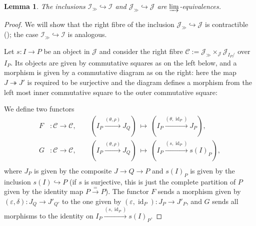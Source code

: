 \documentclass[12pt, reqno]{amsart}
\theoremstyle{plain}
\newtheorem{lemma}[theorem]{Lemma}
\theoremstyle{definition}
\renewcommand{\epsilon}{\varepsilon}
\begin{document}
\begin{lemma}\label{Jgg in J is cofinal}
The inclusions $\mathcal{I}_\gg\hookrightarrow \mathcal{I}$ and $\mathcal{J}_\gg\hookrightarrow \mathcal{J}$ are $\varinjlim$-equivalences.
\end{lemma}
\begin{proof}
We will show that the right fibre of the inclusion $\mathcal{J}_\gg\hookrightarrow \mathcal{J}$ is contractible (\cite[Theorem 2.19]{ClausenOrsnesJansen}); the case $\mathcal{I}_\gg\hookrightarrow \mathcal{I}$ is analogous.

Let $s\colon I\rightarrow P$ be an object in $\mathcal{J}$ and consider the right fibre $\mathcal{C}:=\mathcal{J}_\gg\times_{\mathcal{J}}\mathcal{J}_{I_P/}$ over $I_P$. Its objects are given by commutative squares as on the left below, and a morphism is given by a commutative diagram as on the right: here the map $J\twoheadrightarrow J'$ is required to be surjective and the diagram defines a morphism from the left most inner commutative square to the outer commutative square:
\begin{center}
\end{center}

We define two functors
\begin{align*}
F&\colon \mathcal{C}\rightarrow \mathcal{C},\qquad (I_P\xrightarrow{(\theta, \rho)} J_Q)\ \mapsto\ (I_P\xrightarrow{(\theta, \operatorname{id}_P)}J_P), \\
G&\colon \mathcal{C}\rightarrow \mathcal{C},\qquad (I_P\xrightarrow{(\theta, \rho)} J_Q)\ \mapsto\ (I_P\xrightarrow{(s, \operatorname{id}_P)}s(I)_P), \\
\end{align*}
where $J_P$ is given by the composite $J\rightarrow Q\rightarrow P$ and $s(I)_P$ is given by the inclusion $s(I)\hookrightarrow P$ (if $s$ is surjective, this is just the complete partition of $P$ given by the identity map $P\xrightarrow{=} P$). The functor $F$ sends a morphism given by $(\epsilon,\delta)\colon J_Q\rightarrow J'_{Q'}$ to the one given by $(\epsilon,\operatorname{id}_P)\colon J_P\rightarrow J'_P$, and $G$ sends all morphisms to the identity on $I_P\xrightarrow{(s,\operatorname{id}_P)} s(I)_P$.


\end{proof}
\end{document}

